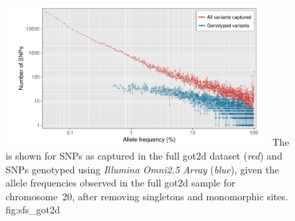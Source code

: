 

\begin{figure}[!htb]
\centering
\includegraphics[width=0.9\textwidth]{./img/ch2/sfs_got2d}
{The  is shown for SNPs as captured in the full \gls{got2d} dataset (\emph{red}) and SNPs genotyped using \emph{Illumina Omni2.5 Array} (\emph{blue}), given the allele frequencies observed in the full \gls{got2d} sample for chromosome~20, after removing singletons and monomorphic sites.\AdditionLabel}
{fig:sfs_got2d}
\end{figure}
